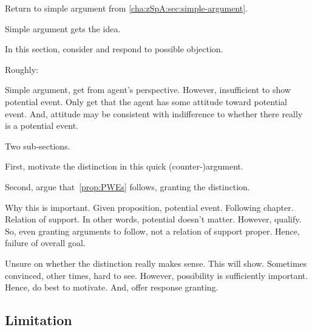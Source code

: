 \begin{note}
  Return to simple argument from \autoref{cha:zSpA:sec:simple-argument}.

  Simple argument gets the idea.

  In this section, consider and respond to possible objection.

  Roughly:

  Simple argument, get from agent's perspective.
  However, insufficient to show potential event.
  Only get that the agent has some attitude toward potential event.
  And, attitude may be consistent with indifference to whether there really is a potential event.

  Two sub-sections.

  First, motivate the distinction in this quick (counter-)argument.

  Second, argue that~\autoref{prop:PWEs} follows, granting the distinction.
\end{note}

\begin{note}
  Why this is important.
  Given proposition, potential event.
  Following chapter.
  Relation of support.
  In other words, potential doesn't matter.
  However, qualify.
  So, even granting arguments to follow, not a relation of support proper.
  Hence, failure of overall goal.
\end{note}

\begin{note}
  Unsure on whether the distinction really makes sense.
  This will show.
  Sometimes convinced, other times, hard to see.
  However, possibility is sufficiently important.
  Hence, do best to motivate.
  And, offer response granting.
\end{note}

\subsection{Limitation}
\label{sec:limitation}
\nocite{Perry:1979vc}
\nocite{Perry:1986aa}

